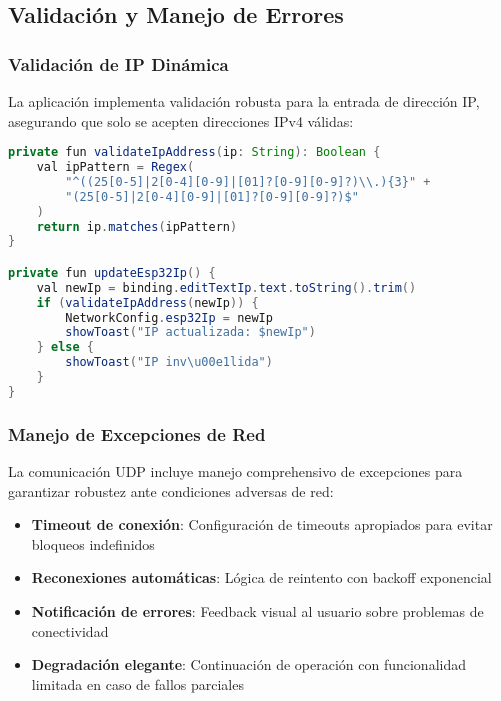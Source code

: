\documentclass[conference,a4paper]{IEEEtran}
\begin{document}
\subsection{Validaci\'on y Manejo de Errores}

\subsubsection{Validaci\'on de IP Din\'amica}

La aplicaci\'on implementa validaci\'on robusta para la entrada de direcci\'on IP, asegurando que solo se acepten direcciones IPv4 v\'alidas:

\begin{lstlisting}[style=arduino, caption=Validaci\'on de IP, language=Java]
private fun validateIpAddress(ip: String): Boolean {
    val ipPattern = Regex(
        "^((25[0-5]|2[0-4][0-9]|[01]?[0-9][0-9]?)\\.){3}" +
        "(25[0-5]|2[0-4][0-9]|[01]?[0-9][0-9]?)$"
    )
    return ip.matches(ipPattern)
}

private fun updateEsp32Ip() {
    val newIp = binding.editTextIp.text.toString().trim()
    if (validateIpAddress(newIp)) {
        NetworkConfig.esp32Ip = newIp
        showToast("IP actualizada: $newIp")
    } else {
        showToast("IP inv\u00e1lida")
    }
}
\end{lstlisting}

\subsubsection{Manejo de Excepciones de Red}

La comunicaci\'on UDP incluye manejo comprehensivo de excepciones para garantizar robustez ante condiciones adversas de red:

\begin{itemize}
    \item \textbf{Timeout de conexi\'on}: Configuraci\'on de timeouts apropiados para evitar bloqueos indefinidos
    \item \textbf{Reconexiones autom\'aticas}: L\'ogica de reintento con backoff exponencial
    \item \textbf{Notificaci\'on de errores}: Feedback visual al usuario sobre problemas de conectividad
    \item \textbf{Degradaci\'on elegante}: Continuaci\'on de operaci\'on con funcionalidad limitada en caso de fallos parciales
\end{itemize}
\end{document}
